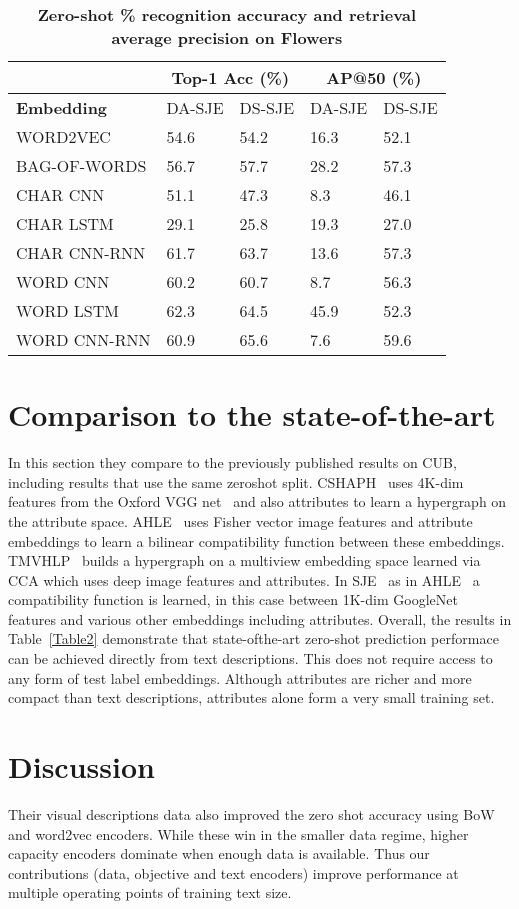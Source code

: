 \documentclass[10pt,twocolumn,letterpaper]{article}
\begin{document}
   \begin{table}[!htbp]
  \centering
 \begin{tabular}{|p{2cm}|p{1cm}|p{1cm}|p{1cm}|p{0.8cm}|}
    \hline
     & \multicolumn{2}{c|}{Top-1 Acc (\%)} & \multicolumn{2}{c|}{AP@50 (\%)}\\
    \hline
     \textbf{Embedding} & DA-SJE & DS-SJE & DA-SJE & DS-SJE\\
    \hline
     WORD2VEC & 54.6 & 54.2 & 16.3 & 52.1 \\
    \hline
     BAG-OF-WORDS & 56.7 & 57.7 & 28.2 & 57.3\\
    \hline
     CHAR CNN & 51.1 & 47.3 & 8.3 & 46.1\\
    \hline
     CHAR LSTM & 29.1 & 25.8 & 19.3 & 27.0\\
    \hline
     CHAR CNN-RNN & 61.7 & 63.7 & 13.6 & 57.3\\
    \hline
     WORD CNN & 60.2 & 60.7 & 8.7 & 56.3\\
    \hline
     WORD LSTM & 62.3 & 64.5 & 45.9 & 52.3 \\
    \hline
     WORD CNN-RNN & 60.9 & 65.6 & 7.6 & 59.6\\
    \hline
  \end{tabular}
  \caption{\textbf{Zero-shot {\%} recognition accuracy and retrieval average precision on Flowers}}\label{Table1}
  \end{table}
\par
\section{Comparison to the state-of-the-art}
In this section they compare to the previously published results on CUB, including results that use the same zeroshot split. CSHAPH~\cite{name18} uses 4K-dim features from the Oxford VGG net~\cite{name40} and also attributes to learn a hypergraph on the attribute space. AHLE~\cite{name1} uses Fisher vector image features and attribute embeddings to learn a bilinear compatibility function between these embeddings. TMVHLP~\cite{name14} builds a hypergraph on a multiview embedding space learned via CCA which uses deep image features and attributes. In SJE~\cite{name2} as in AHLE~\cite{name1} a compatibility function is learned, in this case between 1K-dim GoogleNet~\cite{name44} features and various other embeddings including attributes. Overall, the results in Table~\ref{Table2} demonstrate that state-ofthe-art zero-shot prediction performace can be achieved directly from text descriptions. This does not require access to any form of test label embeddings. Although attributes are richer and more compact than text descriptions, attributes alone form a very small training set. 
\section{Discussion}
Their visual descriptions data also improved the zero shot accuracy using BoW and word2vec encoders. While these win in the smaller data regime, higher capacity encoders dominate when enough data is available. Thus our contributions (data, objective and text encoders) improve performance at multiple operating points of training text size.


\end{document}
